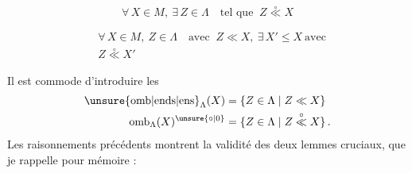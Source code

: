 \[
 \forall\,X\in M,\ \exists\,Z\in\Lambda\quad\text{tel que }\ Z\mathrel{\overset{\circ}{\ll}}X
 \tag*{$\mathrm M\Lambda\,2$}
\]

\[
 \begin{aligned}
 &\forall\,X\in M,\ Z\in\Lambda\quad\text{avec }\ Z\ll X,\ \exists\,X'\leq X\ \text{avec}\\
 &Z\mathrel{\overset{\circ}{\ll}}X'
 \end{aligned}
 \tag*{$\mathrm M\Lambda\,3$}
\]
\endgroup

 Il est commode d'introduire les
\[
 \begin{aligned}
 \unsure{\mathrm{omb}|\mathrm{ends}|\mathrm{ens}}_{\Lambda}(X)
    &=\{Z\in\Lambda\mid Z\ll X\}\\
 \mathrm{omb}_{\Lambda}(X)^{\unsure{\circ|0}}
    &=\{Z\in\Lambda\mid Z\mathrel{\overset{\circ}{\ll}} X\}\,.
 \end{aligned}
\]
Les raisonnements précédents montrent la validité des deux lemmes cruciaux, que je rappelle pour mémoire :
